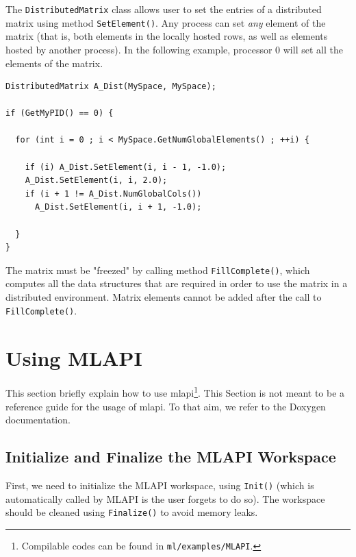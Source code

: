 \documentclass{article}[11pt]
\newcommand{\MLAPI}  {{\sc MLAPI }}
\newcommand{\MLAPIns}  {{\sc mlapi}}
\begin{document}
The {\tt DistributedMatrix} class allows user to set the entries of a
distributed matrix using method {\tt SetElement()}. Any process can set {\sl
  any} element of the matrix (that is, both elements in the locally hosted
rows, as well as elements hosted by another process). In the following
  example, processor 0 will set all the elements of the matrix.
\begin{verbatim}
DistributedMatrix A_Dist(MySpace, MySpace);

if (GetMyPID() == 0) {

  for (int i = 0 ; i < MySpace.GetNumGlobalElements() ; ++i) {

    if (i) A_Dist.SetElement(i, i - 1, -1.0);
    A_Dist.SetElement(i, i, 2.0);
    if (i + 1 != A_Dist.NumGlobalCols())
      A_Dist.SetElement(i, i + 1, -1.0);

  }
}
\end{verbatim}
The matrix must be "freezed" by calling method {\tt FillComplete()}, which
computes all the data structures that are required in order to use the matrix
in a distributed environment. Matrix elements cannot be added after the call
to {\tt FillComplete()}.

\section{Using \MLAPI}
\label{sec:usage}

This section briefly explain how to use \MLAPIns\footnote{Compilable codes
can be found in {\tt ml/examples/MLAPI}.}. This Section is not meant to be a
reference guide for the usage of \MLAPIns. To that aim, we refer to the
Doxygen documentation.

\subsection{Initialize and Finalize the \MLAPI Workspace}
\label{sec:workspace}

First, we need to initialize the \MLAPI workspace, using {\tt Init()} 
(which is automatically called by \MLAPI is the user forgets to do so). The
workspace should be cleaned using {\tt Finalize()} to avoid memory leaks.
\end{document}
